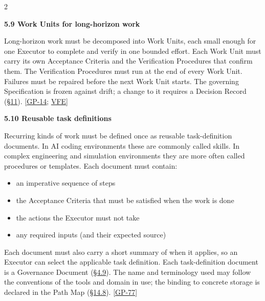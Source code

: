 \begin{multicols}{2}
\hypertarget{nss-5.9}{}

\par\smallskip\noindent\textbf{5.9 Work Units for long-horizon work}\par\nopagebreak

Long-horizon work must be decomposed into Work Units, each small enough for one Executor to complete and verify in one bounded effort. Each Work Unit must carry its own Acceptance Criteria and the Verification Procedures that confirm them. The Verification Procedures must run at the end of every Work Unit. Failures must be repaired before the next Work Unit starts. The governing Specification is frozen against drift; a change to it requires a Decision Record (\hyperlink{nss-11}{\S11}). [\hyperlink{gp-14}{GP-14}; \hyperlink{gp-VFE}{VFE}]

\hypertarget{nss-5.10}{}

\par\smallskip\noindent\textbf{5.10 Reusable task definitions}\par\nopagebreak

Recurring kinds of work must be defined once as reusable task-definition documents. In AI coding environments these are commonly called skills. In complex engineering and simulation environments they are more often called procedures or templates. Each document must contain:

\begin{itemize}\setlength{\itemsep}{0pt}\setlength{\parskip}{0pt}

\item an imperative sequence of steps

\item the Acceptance Criteria that must be satisfied when the work is done

\item the actions the Executor must not take

\item any required inputs (and their expected source)

\end{itemize}

Each document must also carry a short summary of when it applies, so an Executor can select the applicable task definition. Each task-definition document is a Governance Document (\hyperlink{nss-4.9}{\S4.9}). The name and terminology used may follow the conventions of the tools and domain in use; the binding to concrete storage is declared in the Path Map (\hyperlink{nss-14.8}{\S14.8}). [\hyperlink{gp-77}{GP-77}]


\end{multicols}
